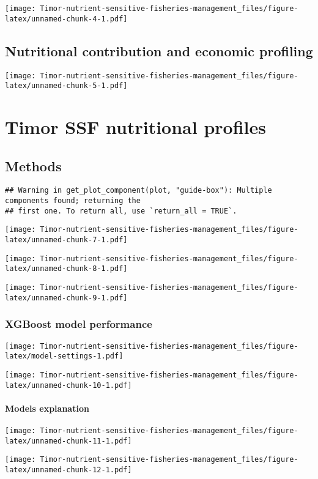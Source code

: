 \documentclass[
]{book}
\begin{document}
\texttt{[image: Timor-nutrient-sensitive-fisheries-management\_files/figure-latex/unnamed-chunk-4-1.pdf]}

\section{Nutritional contribution and economic profiling}\label{nutritional-contribution-and-economic-profiling}

\texttt{[image: Timor-nutrient-sensitive-fisheries-management\_files/figure-latex/unnamed-chunk-5-1.pdf]}

\chapter{Timor SSF nutritional profiles}\label{profiles}

\section{Methods}\label{methods}

\begin{verbatim}
## Warning in get_plot_component(plot, "guide-box"): Multiple components found; returning the
## first one. To return all, use `return_all = TRUE`.
\end{verbatim}

\texttt{[image: Timor-nutrient-sensitive-fisheries-management\_files/figure-latex/unnamed-chunk-7-1.pdf]}

\texttt{[image: Timor-nutrient-sensitive-fisheries-management\_files/figure-latex/unnamed-chunk-8-1.pdf]}

\texttt{[image: Timor-nutrient-sensitive-fisheries-management\_files/figure-latex/unnamed-chunk-9-1.pdf]}

\subsection{XGBoost model performance}\label{xgboost-model-performance}

\texttt{[image: Timor-nutrient-sensitive-fisheries-management\_files/figure-latex/model-settings-1.pdf]}

\texttt{[image: Timor-nutrient-sensitive-fisheries-management\_files/figure-latex/unnamed-chunk-10-1.pdf]}

\subsubsection{Models explanation}\label{models-explanation}

\texttt{[image: Timor-nutrient-sensitive-fisheries-management\_files/figure-latex/unnamed-chunk-11-1.pdf]}

\texttt{[image: Timor-nutrient-sensitive-fisheries-management\_files/figure-latex/unnamed-chunk-12-1.pdf]}

  
\end{document}
